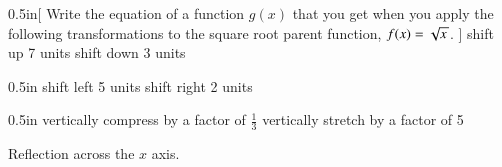 
\begin{my2Problems}[\normalsize]{0.5in}[%
    Write the equation of a function $g(x)$
    that you get when you apply the following transformations
    to the square root parent function, $f(x)=\myRoot{x}$.
    ]
    {shift up 7 units}
    {shift down 3 units}
\end{my2Problems}

\begin{my2Problems}[\normalsize]{0.5in}
    {shift left 5 units}
    {shift right 2 units}
\end{my2Problems}

\begin{my2Problems}[\normalsize]{0.5in}
    {vertically compress by a factor of $\frac{1}{3}$}
    {vertically stretch by a factor of 5}
\end{my2Problems}

\begin{myProblem}[\normalsize]{0.5in}
    {Reflection across the $x$ axis.}
\end{myProblem}
